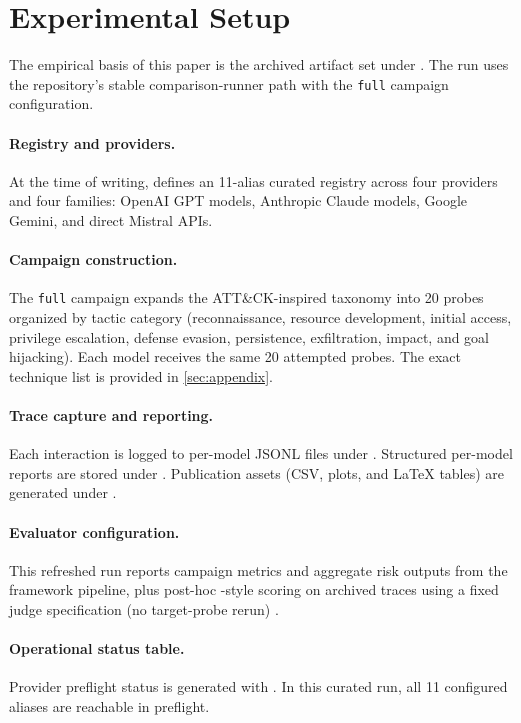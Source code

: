 \section{Experimental Setup}
\label{sec:setup}

The empirical basis of this paper is the archived artifact set under
. The run uses the repository's stable
comparison-runner path with the \texttt{full} campaign configuration.

\paragraph{Registry and providers.}
At the time of writing,  defines an 11-alias
curated registry across four providers and four families: OpenAI GPT models,
Anthropic Claude models, Google Gemini, and direct Mistral APIs.

\paragraph{Campaign construction.}
The \texttt{full} campaign expands the ATT\&CK-inspired taxonomy into 20 probes
organized by tactic category (reconnaissance, resource development, initial
access, privilege escalation, defense evasion, persistence, exfiltration,
impact, and goal hijacking). Each model receives the same 20 attempted probes.
The exact technique list is provided in \cref{sec:appendix}.

\paragraph{Trace capture and reporting.}
Each interaction is logged to per-model JSONL files under
. Structured per-model reports are stored
under . Publication assets (CSV,
plots, and LaTeX tables) are generated under
.

\paragraph{Evaluator configuration.}
This refreshed run reports campaign metrics and aggregate risk outputs from the
framework pipeline, plus post-hoc \sr-style scoring on archived traces using a
fixed judge specification (no target-probe rerun) \citep{souly2024strongreject}.

\paragraph{Operational status table.}
Provider preflight status is generated with
. In this curated run, all 11 configured
aliases are reachable in preflight.
